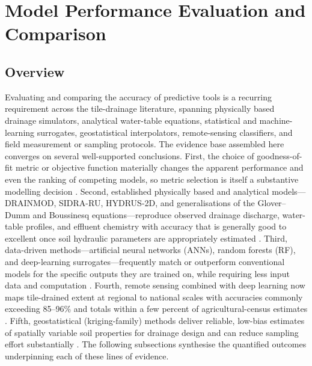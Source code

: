 \documentclass[11pt]{article}
\begin{document}
\section*{Model Performance Evaluation and Comparison}

\subsection{Overview}

Evaluating and comparing the accuracy of predictive tools is a recurring
requirement across the tile-drainage literature, spanning physically based
drainage simulators, analytical water-table equations, statistical and
machine-learning surrogates, geostatistical interpolators, remote-sensing
classifiers, and field measurement or sampling protocols. The evidence base
assembled here converges on several well-supported conclusions. First, the
choice of goodness-of-fit metric or objective function materially changes the
apparent performance and even the ranking of competing models, so metric
selection is itself a substantive modelling decision \parencite{Bruhn2025,STONE1995,SAVABI1995}.
Second, established physically based and analytical models---DRAINMOD, SIDRA-RU,
HYDRUS-2D, and generalisations of the Glover--Dumm and Boussinesq equations---reproduce
observed drainage discharge, water-table profiles, and effluent chemistry with
accuracy that is generally good to excellent once soil hydraulic parameters are
appropriately estimated \parencite{Salazar2008,Jeantet2021,Naderi2025,Mehdinejadiani2013,Mehdinejadiani2020}.
Third, data-driven methods---artificial neural networks (ANNs), random forests
(RF), and deep-learning surrogates---frequently match or outperform conventional
models for the specific outputs they are trained on, while requiring less input
data and computation \parencite{Sarangi2006,Yang2000,Djiemon2019,Ellafi2021,Lei2026}.
Fourth, remote sensing combined with deep learning now maps tile-drained extent
at regional to national scales with accuracies commonly exceeding 85--96\% and
totals within a few percent of agricultural-census estimates \parencite{Valayamkunnath2020,Wan2024,Redoloza2023}.
Fifth, geostatistical (kriging-family) methods deliver reliable, low-bias
estimates of spatially variable soil properties for drainage design and can
reduce sampling effort substantially \parencite{GALLICHAND1991,GALLICHAND1992,Moustafa1998b}.
The following subsections synthesise the quantified outcomes underpinning each
of these lines of evidence.
\end{document}
